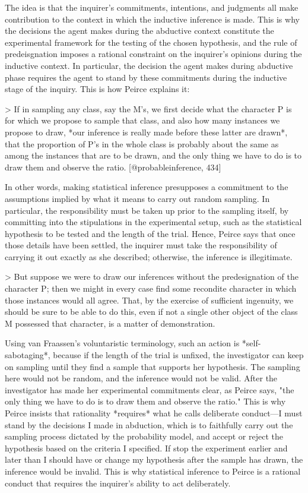 The idea is that the inquirer's commitments, intentions, and judgments
all make contribution to the context in which the inductive inference is
made. This is why the decisions the agent makes during the abductive
context constitute the experimental framework for the testing of the
chosen hypothesis, and the rule of predeisgnation imposes a rational
constraint on the inquirer's opinions during the inductive context. In
particular, the decision the agent makes during abductive phase requires
the agent to stand by these commitments during the inductive stage of
the inquiry. This is how Peirce explains it:

\textgreater{} If in sampling any class, say the M's, we first decide
what the character P is for which we propose to sample that class, and
also how many instances we propose to draw, *our inference is really
made before these latter are drawn*, that the proportion of P's in the
whole class is probably about the same as among the instances that are
to be drawn, and the only thing we have to do is to draw them and
observe the ratio. {[}@probableinference, 434{]}

In other words, making statistical inference presupposes a commitment to
the assumptions implied by what it means to carry out random sampling.
In particular, the responsibility must be taken up prior to the sampling
itself, by committing into the stipulations in the experimental setup,
such as the statistical hypothesis to be tested and the length of the
trial. Hence, Peirce says that once those details have been settled, the
inquirer must take the responsibility of carrying it out exactly as she
described; otherwise, the inference is illegitimate.

\textgreater{} But suppose we were to draw our inferences without the
predesignation of the character P; then we might in every case find some
recondite character in which those instances would all agree. That, by
the exercise of sufficient ingenuity, we should be sure to be able to do
this, even if not a single other object of the class M possessed that
character, is a matter of demonstration.

Using van Fraassen's voluntaristic terminology, such an action is
*self-sabotaging*, because if the length of the trial is unfixed, the
investigator can keep on sampling until they find a sample that supports
her hypothesis. The sampling here would not be random, and the inference
would not be valid. After the investigator has made her experimental
commitments clear, as Peirce says, "the only thing we have to do is to
draw them and observe the ratio." This is why Peirce insists that
rationality *requires* what he calls deliberate conduct---I must stand
by the decisions I made in abduction, which is to faithfully carry out
the sampling process dictated by the probability model, and accept or
reject the hypothesis based on the criteria I specified. If stop the
experiment earlier and later than I should have or change my hypothesis
after the sample has drawn, the inference would be invalid. This is why
statistical inference to Peirce is a rational conduct that requires the
inquirer's ability to act deliberately.

